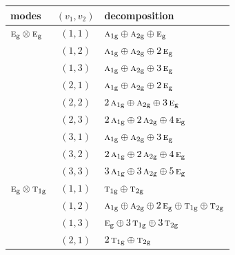 \documentclass[11pt]{article}
\newcommand{\irr}[1]{\text{\normalfont\scshape #1}}
\newcommand{\ptag}[1]{\mathrm{#1}}
\begin{document}
\begin{longtable}{p{} c p{}}\hline modes & $(v_1,v_2)$ & decomposition\\ \hline\endhead

$\irr{e}_{\ptag{g}}\otimes \irr{e}_{\ptag{g}}$ & $(1,1)$ & $\irr{a}_{1\ptag{g}}\oplus \irr{a}_{2\ptag{g}}\oplus \irr{e}_{\ptag{g}}$\\

 & $(1,2)$ & $\irr{a}_{1\ptag{g}}\oplus \irr{a}_{2\ptag{g}}\oplus 2\,\irr{e}_{\ptag{g}}$\\

 & $(1,3)$ & $\irr{a}_{1\ptag{g}}\oplus \irr{a}_{2\ptag{g}}\oplus 3\,\irr{e}_{\ptag{g}}$\\

 & $(2,1)$ & $\irr{a}_{1\ptag{g}}\oplus \irr{a}_{2\ptag{g}}\oplus 2\,\irr{e}_{\ptag{g}}$\\

 & $(2,2)$ & $2\,\irr{a}_{1\ptag{g}}\oplus \irr{a}_{2\ptag{g}}\oplus 3\,\irr{e}_{\ptag{g}}$\\

 & $(2,3)$ & $2\,\irr{a}_{1\ptag{g}}\oplus 2\,\irr{a}_{2\ptag{g}}\oplus 4\,\irr{e}_{\ptag{g}}$\\

 & $(3,1)$ & $\irr{a}_{1\ptag{g}}\oplus \irr{a}_{2\ptag{g}}\oplus 3\,\irr{e}_{\ptag{g}}$\\

 & $(3,2)$ & $2\,\irr{a}_{1\ptag{g}}\oplus 2\,\irr{a}_{2\ptag{g}}\oplus 4\,\irr{e}_{\ptag{g}}$\\

 & $(3,3)$ & $3\,\irr{a}_{1\ptag{g}}\oplus 3\,\irr{a}_{2\ptag{g}}\oplus 5\,\irr{e}_{\ptag{g}}$\\

\hline

$\irr{e}_{\ptag{g}}\otimes \irr{t}_{1\ptag{g}}$ & $(1,1)$ & $\irr{t}_{1\ptag{g}}\oplus \irr{t}_{2\ptag{g}}$\\

 & $(1,2)$ & $\irr{a}_{1\ptag{g}}\oplus \irr{a}_{2\ptag{g}}\oplus 2\,\irr{e}_{\ptag{g}}\oplus \irr{t}_{1\ptag{g}}\oplus \irr{t}_{2\ptag{g}}$\\

 & $(1,3)$ & $\irr{e}_{\ptag{g}}\oplus 3\,\irr{t}_{1\ptag{g}}\oplus 3\,\irr{t}_{2\ptag{g}}$\\

 & $(2,1)$ & $2\,\irr{t}_{1\ptag{g}}\oplus \irr{t}_{2\ptag{g}}$\\


\end{longtable}
\end{document}
